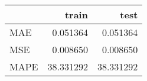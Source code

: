 \begin{tabular}{lrr}
\toprule
{} &      train &       test \\
\midrule
MAE  &   0.051364 &   0.051364 \\
MSE  &   0.008650 &   0.008650 \\
MAPE &  38.331292 &  38.331292 \\
\bottomrule
\end{tabular}
